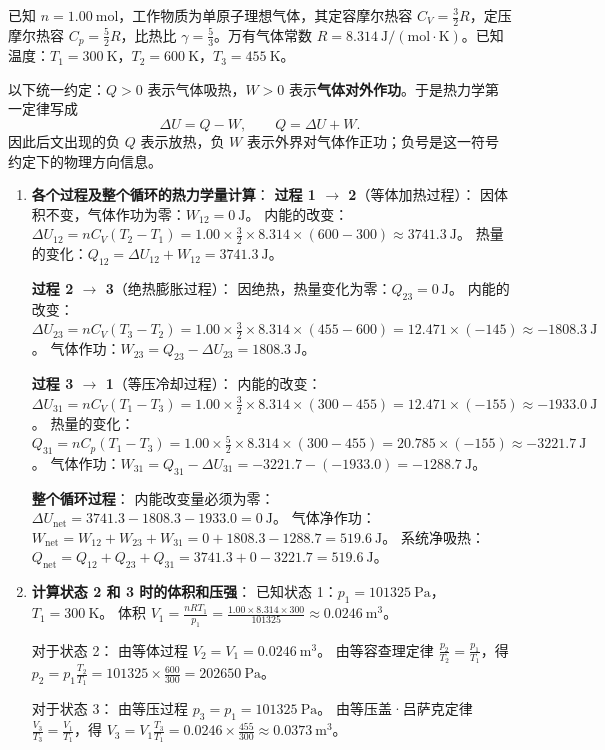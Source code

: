 \begin{solution}
已知 $n = 1.00 \ \mathrm{mol}$，工作物质为单原子理想气体，其定容摩尔热容 $C_V = \frac{3}{2}R$，定压摩尔热容 $C_p = \frac{5}{2}R$，比热比 $\gamma = \frac{5}{3}$。万有气体常数 $R = 8.314 \ \mathrm{J/(mol \cdot K)}$。已知温度：$T_1 = 300 \ \mathrm{K}$，$T_2 = 600 \ \mathrm{K}$，$T_3 = 455 \ \mathrm{K}$。

以下统一约定：$Q>0$ 表示气体吸热，$W>0$ 表示\textbf{气体对外作功}。于是热力学第一定律写成
\[
\Delta U=Q-W,\qquad Q=\Delta U+W.
\]
因此后文出现的负 $Q$ 表示放热，负 $W$ 表示外界对气体作正功；负号是这一符号约定下的物理方向信息。

\begin{enumerate}
    \item[(a)] \textbf{各个过程及整个循环的热力学量计算}：
    \textbf{过程 1 $\to$ 2}（等体加热过程）：
    因体积不变，气体作功为零：$W_{12} = 0 \ \mathrm{J}$。
    内能的改变：$\Delta U_{12} = n C_V (T_2 - T_1) = 1.00 \times \frac{3}{2} \times 8.314 \times (600 - 300) \approx 3741.3 \ \mathrm{J}$。
    热量的变化：$Q_{12} = \Delta U_{12} + W_{12} = 3741.3 \ \mathrm{J}$。

    \textbf{过程 2 $\to$ 3}（绝热膨胀过程）：
    因绝热，热量变化为零：$Q_{23} = 0 \ \mathrm{J}$。
    内能的改变：$\Delta U_{23} = n C_V (T_3 - T_2) = 1.00 \times \frac{3}{2} \times 8.314 \times (455 - 600) = 12.471 \times (-145) \approx -1808.3 \ \mathrm{J}$。
    气体作功：$W_{23} = Q_{23} - \Delta U_{23} = 1808.3 \ \mathrm{J}$。

    \textbf{过程 3 $\to$ 1}（等压冷却过程）：
    内能的改变：$\Delta U_{31} = n C_V (T_1 - T_3) = 1.00 \times \frac{3}{2} \times 8.314 \times (300 - 455) = 12.471 \times (-155) \approx -1933.0 \ \mathrm{J}$。
    热量的变化：$Q_{31} = n C_p (T_1 - T_3) = 1.00 \times \frac{5}{2} \times 8.314 \times (300 - 455) = 20.785 \times (-155) \approx -3221.7 \ \mathrm{J}$。
    气体作功：$W_{31} = Q_{31} - \Delta U_{31} = -3221.7 - (-1933.0) = -1288.7 \ \mathrm{J}$。

    \textbf{整个循环过程}：
    内能改变量必须为零：$\Delta U_{\text{net}} = 3741.3 - 1808.3 - 1933.0 = 0 \ \mathrm{J}$。
    气体净作功：$W_{\text{net}} = W_{12} + W_{23} + W_{31} = 0 + 1808.3 - 1288.7 = 519.6 \ \mathrm{J}$。
    系统净吸热：$Q_{\text{net}} = Q_{12} + Q_{23} + Q_{31} = 3741.3 + 0 - 3221.7 = 519.6 \ \mathrm{J}$。

    \item[(b)] \textbf{计算状态 2 和 3 时的体积和压强}：
    已知状态 1：$p_1 = 101325 \ \mathrm{Pa}$，$T_1 = 300 \ \mathrm{K}$。
    体积 $V_1 = \frac{nRT_1}{p_1} = \frac{1.00 \times 8.314 \times 300}{101325} \approx 0.0246 \ \mathrm{m^3}$。
    
    对于状态 2：
    由等体过程 $V_2 = V_1 = 0.0246 \ \mathrm{m^3}$。
    由等容查理定律 $\frac{p_2}{T_2} = \frac{p_1}{T_1}$，得 $p_2 = p_1 \frac{T_2}{T_1} = 101325 \times \frac{600}{300} = 202650 \ \mathrm{Pa}$。

    对于状态 3：
    由等压过程 $p_3 = p_1 = 101325 \ \mathrm{Pa}$。
    由等压盖·吕萨克定律 $\frac{V_3}{T_3} = \frac{V_1}{T_1}$，得 $V_3 = V_1 \frac{T_3}{T_1} = 0.0246 \times \frac{455}{300} \approx 0.0373 \ \mathrm{m^3}$。
\end{enumerate}
\end{solution}

